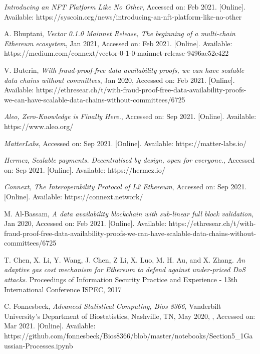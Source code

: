 \documentclass[peerreview]{ieeesyscoin}
\begin{document}
\begin{thebibliography}{00}
  \textit{Introducing an NFT Platform Like No Other}, Accessed on: Feb 2021. [Online]. Available: https://syscoin.org/news/introducing-an-nft-platform-like-no-other

 A. Bhuptani, \textit{Vector 0.1.0 Mainnet Release, The beginning of a multi-chain Ethereum ecosystem}, Jan 2021, Accessed on: Feb 2021.  [Online]. Available:  https://medium.com/connext/vector-0-1-0-mainnet-release-9496ae52c422

  V. Buterin, \textit{With fraud-proof-free data availability proofs, we can have scalable data chains without committees}, Jan 2020, Accessed on: Feb 2021.  [Online]. Available:  https://ethresear.ch/t/with-fraud-proof-free-data-availability-proofs-we-can-have-scalable-data-chains-without-committees/6725

  \textit{Aleo, Zero-Knowledge is Finally Here.}, Accessed on: Sep 2021. [Online]. Available: https://www.aleo.org/

  \textit{MatterLabs}, Accessed on: Sep 2021. [Online]. Available: https://matter-labs.io/

  \textit{Hermez, Scalable payments. Decentralised by design, open for everyone.}, Accessed on: Sep 2021. [Online]. Available: https://hermez.io/

  \textit{Connext, The Interoperability Protocol of L2 Ethereum}, Accessed on: Sep 2021. [Online]. Available: https://connext.network/

 M. Al-Bassam,\textit{ A data availability blockchain with sub-linear full block validation}, Jan 2020, Accessed on: Feb 2021.  [Online]. Available:  https://ethresear.ch/t/with-fraud-proof-free-data-availability-proofs-we-can-have-scalable-data-chains-without-committees/6725

  T. Chen, X. Li, Y. Wang, J. Chen, Z Li, X. Luo, M. H. Au, and X. Zhang. \textit{An adaptive gas cost mechanism for Ethereum to defend against under-priced DoS attacks}. Proceedings of Information Security Practice and Experience - 13th International Conference ISPEC, 2017



 C. Fonnesbeck, \textit{Advanced Statistical Computing, Bios 8366}, Vanderbilt University's Department of Biostatistics, Nashville, TN, May 2020, , Accessed on: Mar 2021.  [Online]. Available:  https://github.com/fonnesbeck/Bios8366/blob/master/notebooks/Section5\_1\-Gaussian-Processes.ipynb


\end{thebibliography}
\end{document}
